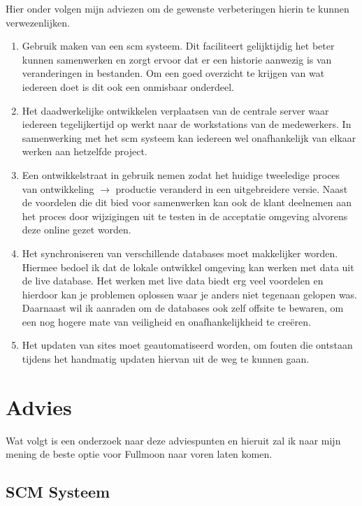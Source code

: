 \documentclass[12pt,a4paper]{article}
\begin{document}
  Hier onder volgen mijn adviezen om de gewenste verbeteringen hierin te kunnen verwezenlijken.
  
  \begin{enumerate}
    \item Gebruik maken van een {\sc scm} systeem. Dit faciliteert gelijktijdig het beter kunnen 
    samenwerken en zorgt ervoor dat er een historie aanwezig is van veranderingen in bestanden. Om een 
    goed overzicht te krijgen van wat iedereen doet is dit ook een onmisbaar onderdeel.
    \item Het daadwerkelijke ontwikkelen verplaatsen van de centrale server waar iedereen tegelijkertijd op werkt naar de workstations van de medewerkers. In samenwerking met het {\sc scm} systeem kan iedereen wel onafhankelijk van elkaar werken aan hetzelfde project.
    \item Een ontwikkelstraat in gebruik nemen zodat het huidige tweeledige proces van ontwikkeling $\to$ productie veranderd in een uitgebreidere versie. Naast de voordelen die dit bied voor samenwerken kan ook de klant deelnemen aan het proces door wijzigingen uit te testen in de acceptatie omgeving alvorens deze online gezet worden.
    \item Het synchroniseren van verschillende databases moet makkelijker worden. Hiermee bedoel ik dat de lokale ontwikkel omgeving kan werken met data uit de live database. Het werken met live data biedt erg veel voordelen en hierdoor kan je problemen oplossen waar je anders niet tegenaan gelopen was. Daarnaast wil ik aanraden om de databases ook zelf offsite te bewaren, om een nog hogere mate van veiligheid en onafhankelijkheid te cre\"{e}ren.
    \item Het updaten van sites moet geautomatiseerd worden, om fouten die ontstaan tijdens het handmatig updaten hiervan uit de weg te kunnen gaan.
  \end{enumerate}
  
  \section{Advies}

  Wat volgt is een onderzoek naar deze adviespunten en hieruit zal ik naar mijn mening de beste optie voor Fullmoon naar voren laten komen.
  
    \subsection{SCM Systeem}
    
\end{document}
